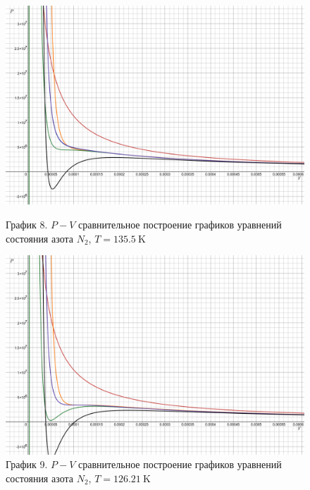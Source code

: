 \documentclass[a4paper]{article}
\numberwithin{equation}{subsection} %
\begin{document}
\begin{figure}[h!]
    \centering
    \begin{minipage}{0.49\textwidth}
        \centering
        \includegraphics[width=\linewidth]{Graphics/N2/135_5.png}
        \caption{\label{fig:clausius_1}График 8. $P-V$ сравнительное построение графиков уравнений состояния азота $N_2$, $T = 135.5 \ \text{K}$}
    \end{minipage}
    \hfill
    \begin{minipage}{0.49\textwidth}
        \centering
        \includegraphics[width=\linewidth]{Graphics/N2/126_21.png}
        \caption{\label{fig:clausius_1}График 9. $P-V$ сравнительное построение графиков уравнений состояния азота $N_2$, $T = 126.21 \ \text{K}$}
    \end{minipage}
\end{figure}
\end{document}
